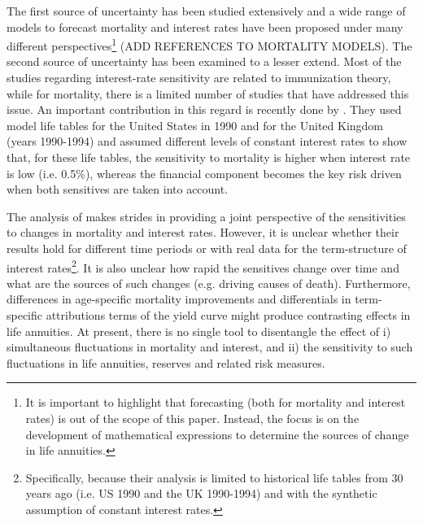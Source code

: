 \documentclass[12pt]{article}
\begin{document}
The first source of uncertainty has been studied extensively and a wide range of models to forecast mortality and interest rates have been proposed under many different perspectives\footnote{It is important to highlight that forecasting (both for mortality and interest rates) is out of the scope of this paper. Instead, the focus is on the development of mathematical expressions to determine the sources of change in life annuities.} \citep{cairns2017modelling,cairns2019modelling,kallestrup2020insight} (ADD REFERENCES TO MORTALITY MODELS). The second source of uncertainty has been examined to a lesser extend. Most of the studies regarding interest-rate sensitivity are related to immunization theory, while for mortality, there is a limited number of studies that have addressed this issue. An important contribution in this regard is recently done by \citet{rabitti2020mortality}. They used model life tables for the United States in 1990 and for the United Kingdom (years 1990-1994) and assumed different levels of constant interest rates to show that, for these life tables, the sensitivity to mortality is higher when interest rate is low (i.e. 0.5\%), whereas the financial component becomes the key risk driven when both sensitives are taken into account. 


The analysis of \citet{rabitti2020mortality} makes strides in providing a joint perspective of the sensitivities to changes in mortality and interest rates. However, it is unclear whether their results hold for different time periods or with real data for the term-structure of interest rates\footnote{Specifically, because their analysis is limited to historical life tables from 30 years ago (i.e. US 1990 and the UK 1990-1994) and with the synthetic assumption of constant interest rates.}. It is also unclear how rapid the sensitives change over time and what are the sources of such changes (e.g. driving causes of death). Furthermore, differences in age-specific mortality improvements and differentials in term-specific attributions terms of the yield curve might produce contrasting effects in life annuities. At present, there is no single tool to disentangle the effect of i) simultaneous fluctuations in mortality and interest, and ii) the sensitivity to such fluctuations in life annuities, reserves and related risk measures. 
\end{document}
